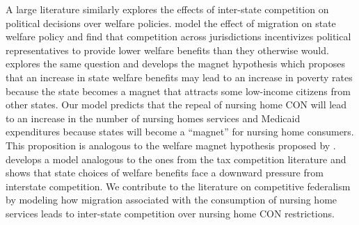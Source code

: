 \documentclass[../Main.tex]{subfiles}
\begin{document}
A large literature similarly explores the effects of inter-state competition on political decisions over welfare policies. \citet{gramlich1984migration} model the effect of migration on state welfare policy and find that competition across jurisdictions incentivizes political representatives to provide lower welfare benefits than they otherwise would. \citet{peterson1989american} explores the same question and develops the magnet hypothesis which proposes that an increase in state welfare benefits may lead to an increase in poverty rates because the state becomes a magnet that attracts some low-income citizens from other states. Our model predicts that the repeal of nursing home CON will lead to an increase in the number of nursing homes services and Medicaid expenditures because states will become a ``magnet'' for nursing home consumers. This proposition is analogous to the welfare magnet hypothesis proposed by \citet{peterson1989american}. \citet{saavedra2000model} develops a model analogous to the ones from the tax competition literature and shows that state choices of welfare benefits face a downward pressure from interstate competition. We contribute to the literature on competitive federalism by modeling how migration associated with the consumption of nursing home services leads to inter-state competition over nursing home CON restrictions. 


\end{document}
